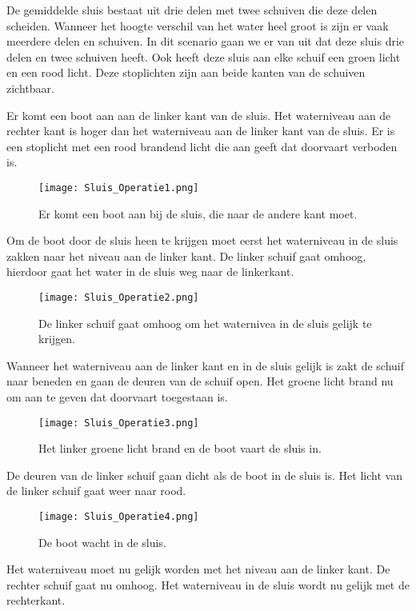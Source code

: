 \documentclass[../verslag.tex]{subfiles}
\begin{document}
De gemiddelde sluis bestaat uit drie delen met twee schuiven die deze delen scheiden. Wanneer het hoogte verschil van het water heel groot is zijn er vaak meerdere delen en schuiven. In dit scenario gaan we er van uit dat deze sluis drie delen en twee schuiven heeft. Ook heeft deze sluis aan elke schuif een groen licht en een rood licht. Deze stoplichten zijn aan beide kanten van de schuiven zichtbaar.

Er komt een boot aan aan de linker kant van de sluis. Het waterniveau aan de rechter kant is hoger dan het waterniveau aan de linker kant van de sluis. Er is een stoplicht met een rood brandend licht die aan geeft dat doorvaart verboden is.

\begin{figure}[H]
	\texttt{[image: Sluis\_Operatie1.png]}
	\caption{
		Er komt een boot aan bij de sluis, die naar de andere kant moet.
	}
	\label{sluis_op1}
\end{figure}

Om de boot door de sluis heen te krijgen moet eerst het waterniveau in de sluis zakken naar het niveau aan de linker kant. De linker schuif gaat omhoog, hierdoor gaat het water in de sluis weg naar de linkerkant.

\begin{figure}[H]
	\texttt{[image: Sluis\_Operatie2.png]}
	\caption{
		De linker schuif gaat omhoog om het waternivea in de sluis gelijk te krijgen.
	}
	\label{sluis_op2}
\end{figure}

Wanneer het waterniveau aan de linker kant en in de sluis gelijk is zakt de schuif naar beneden en gaan de deuren van de schuif open. Het groene licht brand nu om aan te geven dat doorvaart toegestaan is.

\begin{figure}[H]
	\texttt{[image: Sluis\_Operatie3.png]}
	\caption{
		Het linker groene licht brand en de boot vaart de sluis in.
	}
	\label{sluis_op3}
\end{figure}

De deuren van de linker schuif gaan dicht als de boot in de sluis is. Het licht van de linker schuif gaat weer naar rood.

\begin{figure}[H]
	\texttt{[image: Sluis\_Operatie4.png]}
	\caption{
		De boot wacht in de sluis.
	}
	\label{sluis_op4}
\end{figure}

Het waterniveau moet nu gelijk worden met het niveau aan de linker kant. De rechter schuif gaat nu omhoog. Het waterniveau in de sluis wordt nu gelijk met de rechterkant.
\end{document}
